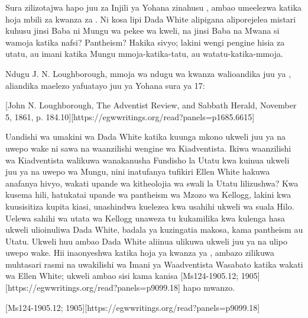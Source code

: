 Sura zilizotajwa hapo juu za Injili ya Yohana zinahusu , ambao umeelezwa katika hoja mbili za kwanza za . Ni kosa lipi Dada White alipigana aliporejelea mistari kuhusu jinsi Baba ni Mungu wa pekee wa kweli, na jinsi Baba na Mwana si wamoja katika nafsi? Pantheism? Hakika sivyo; lakini wengi pengine hisia za utatu, au imani katika Mungu mmoja-katika-tatu, au watatu-katika-mmoja.

Ndugu J. N. Loughborough, mmoja wa ndugu wa kwanza walioandika juu ya , aliandika maelezo yafuatayo juu ya Yohana sura ya 17:

[John N. Loughborough, The Adventist Review, and Sabbath Herald, November 5, 1861, p. 184.10][https://egwwritings.org/read?panels=p1685.6615]

Uandishi wa umakini wa Dada White katika kuunga mkono ukweli juu ya  na uwepo wake ni sawa na waanzilishi wengine wa Kiadventista. Ikiwa waanzilishi wa Kiadventista walikuwa wanakanusha Fundisho la Utatu kwa kuinua ukweli juu ya  na uwepo wa Mungu, nini inatufanya tufikiri Ellen White hakuwa anafanya hivyo, wakati upande wa kitheolojia wa swali la Utatu lilizushwa? Kwa kusema hili, hatukatai upande wa pantheism wa Mzozo wa Kellogg, lakini kwa kuusisitiza kupita kiasi, unashindwa kuelezea kwa usahihi ukweli wa suala Hilo. Uelewa sahihi wa utata wa Kellogg unaweza tu kukamilika kwa kulenga hasa ukweli ulioinuliwa Dada White, badala ya kuzingatia makosa, kama pantheism au Utatu. Ukweli huu ambao Dada White aliinua ulikuwa ukweli juu ya  na ulipo uwepo wake. Hii inaonyeshwa katika hoja ya kwanza ya , ambazo zilikuwa muhtasari rasmi na uwakilishi wa Imani ya Waadventista Wasabato katika wakati wa Ellen White; ukweli ambao sisi kama kanisa [Ms124-1905.12; 1905][https://egwwritings.org/read?panels=p9099.18] hapo mwanzo.

[Ms124-1905.12; 1905][https://egwwritings.org/read?panels=p9099.18]

